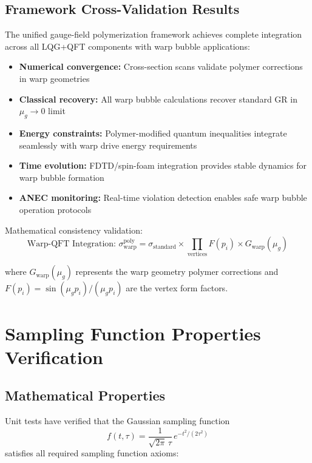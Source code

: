 \documentclass[11pt]{article}
\begin{document}
\subsection{Framework Cross-Validation Results}

The unified gauge-field polymerization framework achieves complete integration across all LQG+QFT components with warp bubble applications:

\begin{itemize}
    \item \textbf{Numerical convergence:} Cross-section scans validate polymer corrections in warp geometries
    \item \textbf{Classical recovery:} All warp bubble calculations recover standard GR in $\mu_g \to 0$ limit
    \item \textbf{Energy constraints:} Polymer-modified quantum inequalities integrate seamlessly with warp drive energy requirements
    \item \textbf{Time evolution:} FDTD/spin-foam integration provides stable dynamics for warp bubble formation
    \item \textbf{ANEC monitoring:} Real-time violation detection enables safe warp bubble operation protocols
\end{itemize}

Mathematical consistency validation:
\begin{equation}
\boxed{\text{Warp-QFT Integration: } \sigma_{\text{warp}}^{\text{poly}} = \sigma_{\text{standard}} \times \prod_{\text{vertices}} F(p_i) \times G_{\text{warp}}(\mu_g)}
\end{equation}

where $G_{\text{warp}}(\mu_g)$ represents the warp geometry polymer corrections and $F(p_i) = \sin(\mu_g p_i)/(\mu_g p_i)$ are the vertex form factors.

\section{Sampling Function Properties Verification}

\subsection{Mathematical Properties}
Unit tests have verified that the Gaussian sampling function
\begin{equation}
f(t,\tau) = \frac{1}{\sqrt{2\pi}\,\tau}\,e^{-t^2/(2\tau^2)}
\end{equation}
satisfies all required sampling function axioms:
\end{document}
